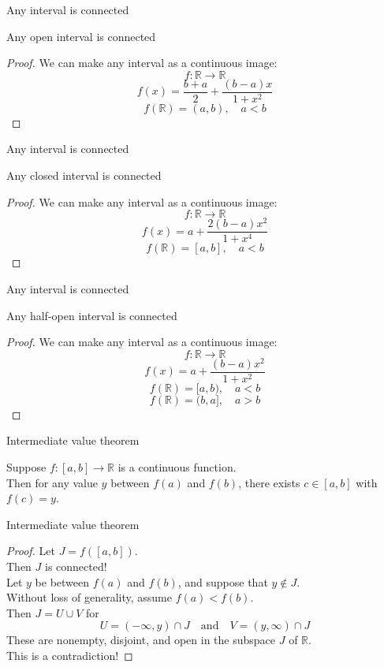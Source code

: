 \documentclass{beamer}
\begin{document}
\begin{frame}{Any interval is connected}
\begin{thm}
Any open interval is connected
\end{thm}
\pause
\begin{proof}
\pause
We can make any interval as a continuous image:
$$f:\mathbb{R}\rightarrow\mathbb{R}$$
$$f(x) = \frac{b+a}{2} + \frac{(b-a)x}{1+x^2}$$
\pause
$$f(\mathbb{R}) = (a,b),\quad a < b$$
\end{proof}
\end{frame}

\begin{frame}{Any interval is connected}
\begin{thm}
Any closed interval is connected
\end{thm}
\pause
\begin{proof}
We can make any interval as a continuous image:
$$f:\mathbb{R}\rightarrow\mathbb{R}$$
$$f(x) = a + \frac{2(b-a)x^2}{1+x^4}$$
\pause
$$f(\mathbb{R}) = [a,b],\quad a < b$$
\end{proof}
\end{frame}

\begin{frame}{Any interval is connected}
\begin{thm}
Any half-open interval is connected
\end{thm}
\pause
\begin{proof}
\pause
We can make any interval as a continuous image:
$$f:\mathbb{R}\rightarrow\mathbb{R}$$
$$f(x) = a + \frac{(b-a)x^2}{1+x^2}$$
\pause
$$f(\mathbb{R}) = [a,b),\quad a < b$$
\pause
$$f(\mathbb{R}) = (b,a],\quad a > b$$
\end{proof}
\end{frame}

\begin{frame}{Intermediate value theorem}
\begin{thm}
Suppose $f: [a,b]\rightarrow\mathbb{R}$ is a continuous function.\\
Then for any value $y$ between $f(a)$ and $f(b)$, there exists $c\in [a,b]$ with $f(c) =y$.
\end{thm}
\end{frame}

\begin{frame}{Intermediate value theorem}
\begin{proof}
\pause
Let $J = f([a,b])$.\\
\pause
Then $J$ is connected!\\
\pause
Let $y$ be between $f(a)$ and $f(b)$, and suppose that $y\notin J$.\\
\pause
Without loss of generality, assume $f(a) < f(b)$.\\
\pause
Then $J = U\cup V$ for
$$U = (-\infty,y)\cap J\quad\text{and}\quad V = (y,\infty)\cap J$$
\pause
These are nonempty, disjoint, and open in the subspace $J$ of $\mathbb{R}$.\\
\pause
This is a contradiction!
\end{proof}
\end{frame}
\end{document}
